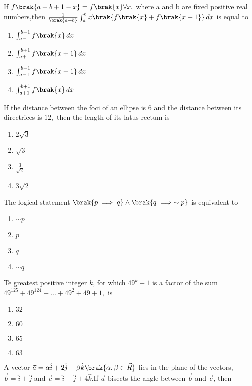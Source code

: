     \item If $f\brak{a+b+1-x}=f\brak{x}\forall{x},$ where a and b are fixed positive real numbers,then $\frac{1}{\brak{a+b}}\int_{a}^{b}x\brak{f\brak{x}+f\brak{x+1}}\,dx$
    is equal to
    \begin{enumerate}
        \item $\int_{a-1}^{b-1}f\brak{x}\,dx$
        \item $\int_{a+1}^{b+1}f\brak{x+1}\,dx$
        \item $\int_{a-1}^{b-1}f\brak{x+1}\,dx$
        \item  $\int_{a+1}^{b+1}f\brak{x}\,dx$\\
    \end{enumerate}
    \item  If the distance between the foci of an ellipse is $6$ and the distance between its directrices is $12,$ then the length of its latus rectum is
    \begin{enumerate}
        \item $2\sqrt{3}$
        \item $\sqrt{3}$
        \item $\frac{3}{\sqrt{2}}$
        \item $3\sqrt{2}$\\
    \end{enumerate}
    \item  The logical statement $\brak{p\implies q}\land \brak{q\implies\sim p}$ is equivalent to
    \begin{enumerate}
        \item $\sim p$
        \item $p$
        \item $q$
        \item $\sim q$\\
    \end{enumerate}
    \item Te greatest positive integer $k$, for which $49^k+1$ is a factor of the sum $49^{125} + 49^{124} + \dots+ 49^2 + 49 + 1,$ is
    \begin{enumerate}
        \item $32$
        \item $60$
        \item $65$
        \item $63$\\
    \end{enumerate}
    \item A vector $\vec{a} = \alpha\hat{i}+2\hat{j}+\beta\hat{k} \brak{\alpha,\beta \in \vec{R}}$ lies in the plane of the vectors,$\vec{b}=\hat{i}+\hat{j}$ and $\vec{c}=\hat{i}-\hat{j}+4\hat{k}.$If $\vec{a}$ bisects the angle between $\vec{b}$ and $\vec{c}$, then
